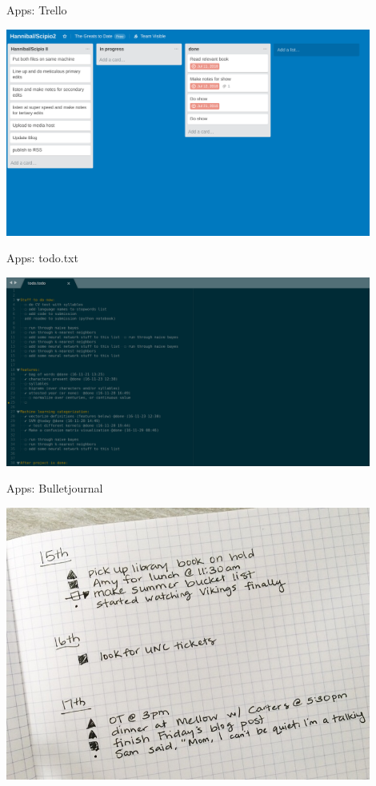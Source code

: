 \documentclass[10pt]{beamer}
\begin{document}
\begin{frame}[c]{Apps: Trello}

\centerline{\includegraphics[width=12cm]{figs/trello.png}}

\end{frame}

\begin{frame}[c]{Apps: todo.txt}

\centerline{\includegraphics[width=12cm]{figs/todotxt.png}}

\end{frame}

\begin{frame}[c]{Apps: Bulletjournal}

\centerline{\includegraphics[width=12cm]{figs/bulletjournal.jpeg}}

\end{frame}
\end{document}
